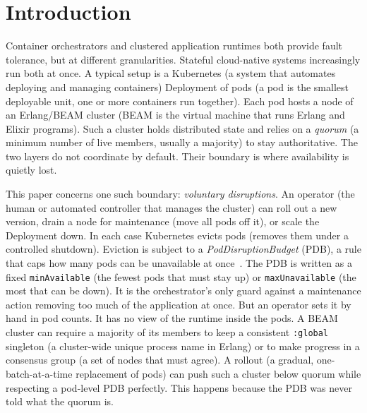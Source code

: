 \documentclass[AMA,Times1COL]{WileyNJDv5}
\begin{document}

\maketitle

\section{Introduction}\label{sec:intro}
Container orchestrators and clustered application runtimes both provide fault tolerance, but at different
granularities. Stateful cloud-native systems increasingly run both at once. A typical setup is a
Kubernetes (a system that automates deploying and managing containers) Deployment of pods (a pod is the
smallest deployable unit, one or more containers run together). Each pod hosts a node of an Erlang/BEAM
cluster (BEAM is the virtual machine that runs Erlang and Elixir programs). Such a cluster holds
distributed state and relies on a \emph{quorum} (a minimum number of live members, usually a majority)
to stay authoritative. The two layers do not coordinate by default. Their boundary is where availability
is quietly lost.

This paper concerns one such boundary: \emph{voluntary disruptions}. An operator (the human or automated
controller that manages the cluster) can roll out a new version, drain a node for maintenance (move all
pods off it), or scale the Deployment down. In each case Kubernetes evicts pods (removes them under a
controlled shutdown). Eviction is subject to a \emph{PodDisruptionBudget} (PDB), a rule that caps how
many pods can be unavailable at once~\cite{k8sPDB}. The PDB is written as a fixed \texttt{minAvailable}
(the fewest pods that must stay up) or \texttt{maxUnavailable} (the most that can be down). It is the
orchestrator's only guard against a maintenance action removing too much of the application at once. But
an operator sets it by hand in pod counts. It has no view of the runtime inside the pods. A BEAM cluster
can require a majority of its members to keep a consistent \texttt{:global} singleton (a cluster-wide unique
process name in Erlang) or to make progress in a consensus group (a set of nodes that must agree). A
rollout (a gradual, one-batch-at-a-time replacement of pods) can push such a cluster below quorum while
respecting a pod-level PDB perfectly. This happens because the PDB was never told what the quorum is.
\end{document}
